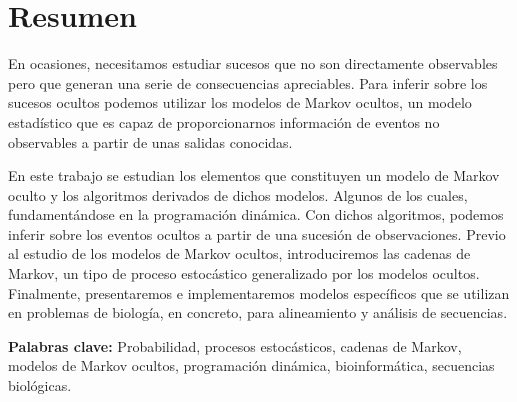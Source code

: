 \chapter*{Resumen}
En ocasiones, necesitamos estudiar sucesos que no son directamente observables pero que generan una serie de consecuencias apreciables. Para inferir sobre los sucesos ocultos podemos utilizar los modelos de Markov ocultos, un modelo estadístico que es capaz de proporcionarnos información de eventos no observables a partir de unas salidas conocidas. 

En este trabajo se estudian los elementos que constituyen un modelo de Markov oculto y los algoritmos derivados de dichos modelos. Algunos de los cuales, fundamentándose en la  programación dinámica. Con dichos algoritmos, podemos inferir sobre los eventos ocultos a partir de una sucesión de observaciones. Previo al estudio de los modelos de Markov ocultos, introduciremos las cadenas de Markov, un tipo de proceso estocástico generalizado por los modelos ocultos. Finalmente, presentaremos e implementaremos modelos específicos que se utilizan en problemas de biología, en concreto, para alineamiento y análisis de secuencias.

\textbf{Palabras clave:} Probabilidad, procesos estocásticos, cadenas de Markov, modelos de Markov ocultos, programación dinámica, bioinformática, secuencias biológicas.